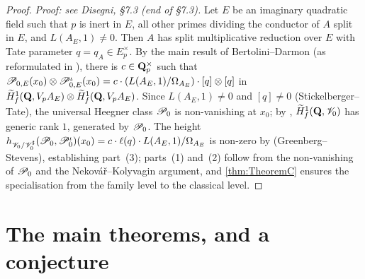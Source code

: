 \begin{proof}
  \textit{Proof: see Disegni, §7.3 (end of §7.3).}
  Let $E$ be an imaginary quadratic field such that $p$ is inert in $E$, all other
  primes dividing the conductor of $A$ split in $E$, and $L(A_E, 1) \neq 0$.  Then $A$
  has split multiplicative reduction over $E$ with Tate parameter
  $q = q_A \in E_p^\times$.  By the main result of Bertolini--Darmon \cite{BDrigid}
  (as reformulated in \cite[Theorem~5.4]{bdsurvey}), there is $c \in \mathbf{Q}_p^\times$ such
  that $\mathscr{P}_{0,E}(x_0) \otimes \mathscr{P}_{0,E}^\iota(x_0) = c \cdot (L(A_E,1)/\Omega_{A_E})
  \cdot [q] \otimes [q]$ in
  $\widetilde{H}^1_f(\mathbf{Q}, V_pA_E) \otimes \widetilde{H}^1_f(\mathbf{Q}, V_pA_E)$.  Since $L(A_E,1) \neq 0$ and
  $[q] \neq 0$ (Stickelberger--Tate), the universal Heegner class $\mathscr{P}_0$ is
  non-vanishing at $x_0$; by \cite{nek-koly}, $\widetilde{H}^1_f(\mathbf{Q}, \mathscr{V}_0)$ has generic rank
  $1$, generated by $\mathscr{P}_0$.  The height
  $h_{\mathscr{V}_0/\mathscr{V}_0^\sharp}(\mathscr{P}_0, \mathscr{P}_0^\iota)(x_0) = c \cdot \ell(q) \cdot
  L(A_E,1)/\Omega_{A_E}$ is non-zero by \cite{st et} (Greenberg--Stevens), establishing
  part~(3); parts~(1) and~(2) follow from the non-vanishing of $\mathscr{P}_0$ and the
  Nekov\'{a}\v{r}--Kolyvagin argument, and \cref{thm:TheoremC} ensures the
  specialisation from the family level to the classical level.
\end{proof}

\section{The main theorems, and a conjecture}

